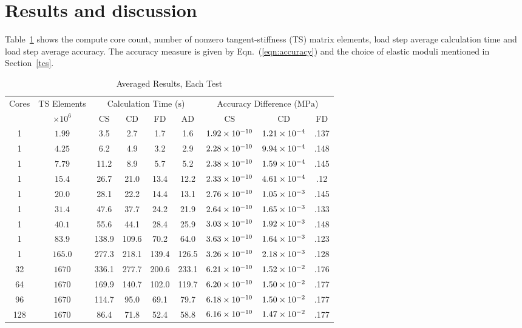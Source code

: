 \documentclass[preprint,12pt]{elsarticle}
\begin{document}
\section{Results and discussion}
\label{sec:Res}
%
Table~\ref{tab:results} shows the compute core count, number of nonzero tangent-stiffness (TS) matrix elements, load step average calculation time and load step average accuracy. The accuracy measure is given by Eqn.~(\ref{eqn:accuracy}) and the choice of elastic moduli mentioned in Section~\ref{tcs}.
%
\begin{table}[!ht]    
  \scriptsize
  \centering
        \caption{Averaged Results, Each Test} \label{tab:results}   
       \begin{tabular}{c c c c c c c c c}
         \toprule
         Cores & TS Elements & \multicolumn{4}{c}{Calculation Time ($\si{\second}$)} & \multicolumn{3}{c}{Accuracy Difference ($\si{\mega\pascal}$)} \\ 
         & $\times 10^6$ & CS & CD & FD & AD & CS & CD & FD \\
        \midrule
        1 & $\num{1.99}$  & 3.5 & 2.7 & 1.7 & 1.6 & $\num{1.92E-10}$ & $\num{1.21E-4}$ & .137 \\
        1 & $\num{4.25}$  & 6.2& 4.9& 3.2& 2.9 & $\num{2.28E-10}$ & $\num{9.94E-4}$ & .148 \\
        1 & $\num{7.79}$  & 11.2& 8.9& 5.7& 5.2 & $\num{2.38E-10}$ & $\num{1.59E-4}$ & .145\\
        1 & $\num{15.4}$  & 26.7& 21.0& 13.4& 12.2 & $\num{2.33E-10}$ & $\num{4.61E-4}$ & .12 \\
        1 & $\num{20.0}$  & 28.1& 22.2& 14.4& 13.1 & $\num{2.76E-10}$ & $\num{1.05E-3}$ & .145 \\
        1 & $\num{31.4}$  & 47.6& 37.7& 24.2& 21.9 & $\num{2.64E-10}$ & $\num{1.65E-3}$ & .133 \\
        1 & $\num{40.1}$  & 55.6& 44.1& 28.4& 25.9 & $\num{3.03E-10}$ & $\num{1.92E-3}$ & .148 \\
        1 & $\num{83.9}$  & 138.9& 109.6& 70.2& 64.0 & $\num{3.63E-10}$ & $\num{1.64E-3}$ & .123 \\
        1 & $\num{165.0}$  & 277.3& 218.1& 139.4& 126.5 & $\num{3.26E-10}$ & $\num{2.18E-3}$ & .128 \\
        32 & $\num{1670}$  & 336.1& 277.7& 200.6& 233.1 & $\num{6.21E-10}$ & $\num{1.52E-2}$ & .176 \\
        64 & $\num{1670}$  & 169.9& 140.7& 102.0& 119.7 & $\num{6.20E-10}$ & $\num{1.50E-2}$ & .177 \\
        96 & $\num{1670}$  & 114.7& 95.0& 69.1 & 79.7 & $\num{6.18E-10}$ & $\num{1.50E-2}$ & .177 \\
        128 & $\num{1670}$  & 86.4& 71.8& 52.4 &58.8 & $\num{6.16E-10}$ & $\num{1.47E-2}$ & .177 \\
        \bottomrule
    \end{tabular}
\end{table}
\end{document}
